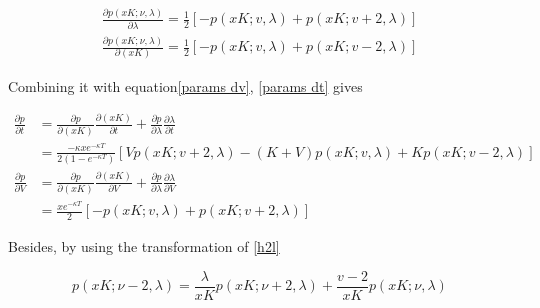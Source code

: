 \begin{equation}\label{pdf1}
    \begin{gathered}
        \frac{\partial p(xK;\nu,\lambda)}{\partial \lambda}=\frac{1}{2}[-p(xK ; v, \lambda)+p(xK ; v+2, \lambda)] \\
        \frac{\partial p(xK;\nu,\lambda)}{\partial (xK)}=\frac{1}{2}[-p(xK ; v, \lambda)+p(xK ; v-2, \lambda)]
    \end{gathered}
\end{equation}




\noindent Combining it with equation\eqref{params dv}, \eqref{params dt} gives

\begin{equation}\label{pdf diff}
    \begin{aligned}
        \frac{\partial p}{\partial t}&= \frac{\partial p}{\partial (xK)}\frac{\partial (xK)}{\partial t} + \frac{\partial p}{\partial \lambda} \frac{\partial \lambda}{\partial t} \\
        &= \frac{-\kappa x e^{-\kappa T}}{2(1 - e^{-\kappa T})} \left[Vp(xK ; v+2, \lambda) - (K+V) p(xK ; v, \lambda) + K p(xK ; v-2, \lambda)\right]\\
        \frac{\partial p}{\partial V} &= \frac{\partial p}{\partial (xK)}\frac{\partial (xK)}{\partial V} + \frac{\partial p}{\partial \lambda} \frac{\partial \lambda}{\partial V} \\
        &= \frac{x e^{-\kappa T}}{2} [-p(xK ; v, \lambda)+p(xK ; v+2, \lambda)]
    \end{aligned}
\end{equation}

\noindent Besides, by using the transformation of \eqref{h2l}

\begin{equation}\label{l2h}
    p(xK ; \nu-2, \lambda)=\frac{\lambda}{xK} p(xK ; \nu+2, \lambda)+\frac{v-2}{xK} p(xK ; \nu, \lambda)
\end{equation}

